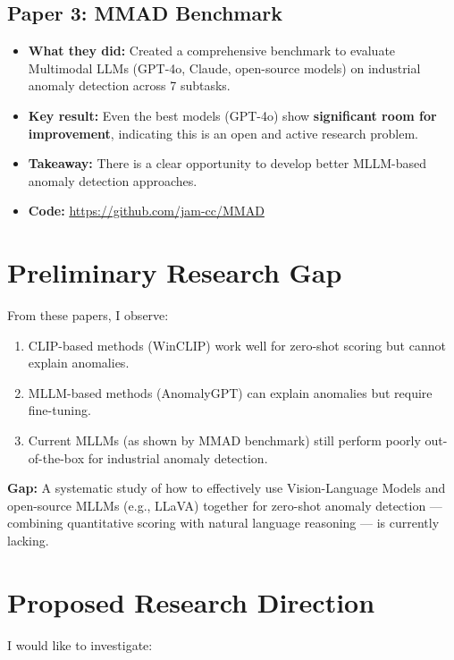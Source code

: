 \documentclass[12pt, a4paper]{article}
\begin{document}
\subsection{Paper 3: MMAD Benchmark \cite{jiang2025mmad}}
\begin{itemize}[leftmargin=*]
    \item \textbf{What they did:} Created a comprehensive benchmark to evaluate Multimodal LLMs (GPT-4o, Claude, open-source models) on industrial anomaly detection across 7 subtasks.
    \item \textbf{Key result:} Even the best models (GPT-4o) show \textbf{significant room for improvement}, indicating this is an open and active research problem.
    \item \textbf{Takeaway:} There is a clear opportunity to develop better MLLM-based anomaly detection approaches.
    \item \textbf{Code:} \url{https://github.com/jam-cc/MMAD}
\end{itemize}

\section{Preliminary Research Gap}

From these papers, I observe:
\begin{enumerate}[leftmargin=*]
    \item CLIP-based methods (WinCLIP) work well for zero-shot scoring but cannot explain anomalies.
    \item MLLM-based methods (AnomalyGPT) can explain anomalies but require fine-tuning.
    \item Current MLLMs (as shown by MMAD benchmark) still perform poorly out-of-the-box for industrial anomaly detection.
\end{enumerate}

\textbf{Gap:} A systematic study of how to effectively use Vision-Language Models and open-source MLLMs (e.g., LLaVA) together for zero-shot anomaly detection --- combining quantitative scoring with natural language reasoning --- is currently lacking.

\section{Proposed Research Direction}

I would like to investigate:
\end{document}
